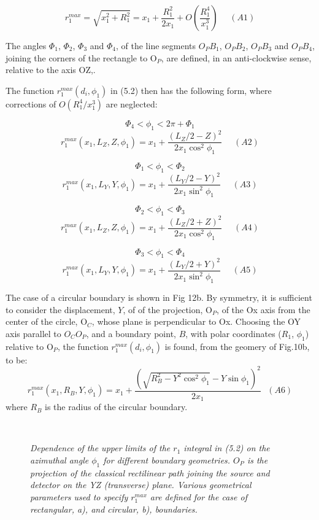 {  \[ r_1^{max} = \sqrt{x_1^2 + R_1^2} = x_1 + \frac{R_1^2}{2 x_1} + O(\frac{R_1^4}{x_1^3})~~~~~~(A1)\]

 The angles $\Phi_1$, $\Phi_2$, $\Phi_3$ and $\Phi_4$, of the line segments $O_P B_1$, $O_P B_2$,
  $O_P B_3$ and  $O_P B_4$, joining the corners of the rectangle to O$_P$, are 
  defined, in an anti-clockwise sense, relative to the axis OZ,.
 \par The function $r_1^{max}(d_i, \phi_1)$ in (5.2) then has the following form,
  where corrections of $ O(R_1^4/x_1^3)$ are neglected:
  \par
  \[\Phi_4 < \phi_1 < 2\pi +\Phi_1\]
  \[ r_1^{max}(x_1,L_Z,Z, \phi_1) = x_1 + \frac{(L_Z/2-Z)^2}{2 x_1 \cos^2 \phi_1}~~~~~~(A2)\]       
    \par
  \[\Phi_1 < \phi_1 < \Phi_2\]
  \[ r_1^{max}(x_1,L_Y,Y, \phi_1) = x_1 + \frac{(L_Y/2-Y)^2}{2 x_1 \sin^2 \phi_1}~~~~~~(A3)\]
      \par
  \[\Phi_2 < \phi_1 < \Phi_3\]
  \[ r_1^{max}(x_1,L_Z,Z, \phi_1) = x_1 + \frac{(L_Z/2+Z)^2}{2 x_1 \cos^2 \phi_1}~~~~~~(A4)\]
        \par
  \[\Phi_3 < \phi_1 < \Phi_4\]
  \[ r_1^{max}(x_1,L_Y,Y, \phi_1) = x_1 + \frac{(L_Y/2+Y)^2}{2 x_1 \sin^2 \phi_1}~~~~~~(A5)\] 
  
  \par The case of a circular boundary is shown in Fig 12b. By symmetry, it is sufficient to consider
   the displacement, $Y$, of of the projection, O$_P$, of the Ox axis from the center of the circle, O$_C$,
   whose plane is perpendicular to Ox. Choosing the OY axis parallel to  $O_C O_P$, and a 
  boundary point, $B$, with polar coordinates ($R_1$, $\phi_1$) relative to O$_P$, the function 
  $r_1^{max}(d_i, \phi_1)$ is
   found, from the geomery of Fig.10b, to be:
  \[  r_1^{max}(x_1,R_B,Y,\phi_1) = x_1 + \frac{(\sqrt{R_B^2-Y^2 \cos^2 \phi_1}-Y \sin\phi_1)^2}{2 x_1}~~~(A6)\]
    where $R_B$ is the radius of the circular boundary.\

 \begin{figure}[htbp]
\begin{center}
\hspace*{-0.5cm}\mbox{
}
\caption{{\sl  Dependence of the upper limits of the $r_1$ integral in (5.2)
   on the azimuthal angle $\phi_1$ for different
   boundary geometries. $O_P$ is the projection of the classical rectilinear path joining the source 
   and detector on the YZ (transverse) plane. Various geometrical parameters used to specify
    $r_1^{max}$ are defined for the case of rectangular, a), and circular, b), boundaries.  }} 
\label{fig-fig12}
\end{center}
\end{figure}
  
}
